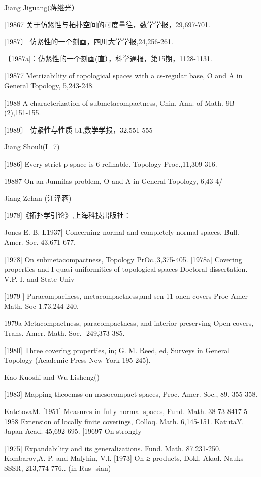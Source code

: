 \documentclass[main.tex]{subfiles}
\begin{document}
\noindent Jiang Jiguang(蒋继光）

[19867 关于仿紧性与拓扑空间的可度量往，数学学报，29,697-701.

[1987〕 仿紧性的一个刻画，四川大学学报,24,256-261.

〔1987a]：仿紧性的一个刻画(直），科学通报，第15期，1128-1131.

[19877 Metrizability of topological spaces with a cs-regular base, O and A
in General Topology, 5,243-248.

[1988 A characterization of submetacompactness, Chin. Ann. of Math. 9B
(2),151-155.

[1989〕 仿紧性与性质 b1,数学学报，32,551-555

\noindent Jiang Shouli(I=7)

[1986] Every strict p-space is 6-refinable. Topology Proc.,11,309-316.

19887 On an Junnilas problem, O and A in General Topology, 6,43-4/

Jiang Zehan (江泽涵)

[1978]《拓扑学引论》,上海科技出版社：

\noindent Jones E. B.
L1937] Concerning normal and completely normal spaces, Bull. Amer. Soc.
43,671-677.

[1978]
On submetacompactness, Topology PrOc.,3,375-405.
[1978a]
Covering properties and
I quasi-uniformities of topological spaces
Doctoral dissertation. V.P. I. and State Univ

[1979 ]
Paracompaciness,
metacompactness,and
sen
11-onen
covers
Proc
Amer Math. Soc
1.73.244-240.

1979a Metacompactness, paracompactness, and
interior-preserving Open
covers, Trans. Amer. Math. Soc. -249,373-385.

[1980]
Three covering properties, in; G. M. Reed, ed, Surveys in General
Topology (Academic Press New York 195-245).

Kao Kuoshi and Wu Lisheng()

[1983]
Mapping theoemss on mesocompact spaces, Proc. Amer. Soc., 89,
355-358.

KatetovaM.
[1951]
Measures in fully normal spaces, Fund. Math. 38 73-8417
5 1958 Extension
of locally finite coverings, Colloq. Math. 6,145-151.
KatutaY.
Japan Acad. 45,692-695.
[19697
On strongly

[1975]
Expandability and its generalizations. Fund. Math. 87.231-250.
Kombarov,A. P. and Malyhin, V.l.
[1973] On ≥-products, Dokl. Akad. Nauks SSSR, 213,774-776.. (in Rus-
sian)
\end{document}
